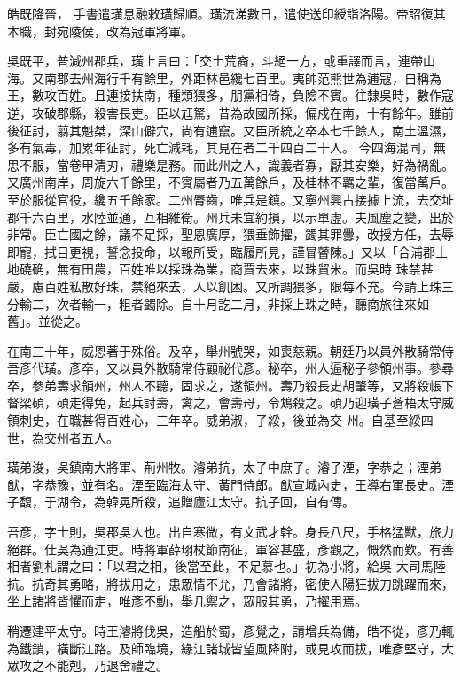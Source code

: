 \begin{pinyinscope}
 皓既降晉，
 手書遣璜息融敕璜歸順。璜流涕數日，遣使送印綬詣洛陽。帝詔復其本職，封宛陵侯，改為冠軍將軍。



 吳既平，普減州郡兵，璜上言曰：「交土荒裔，斗絕一方，或重譯而言，連帶山海。又南郡去州海行千有餘里，外距林邑纔七百里。夷帥范熊世為逋寇，自稱為王，數攻百姓。且連接扶南，種類猥多，朋黨相倚，負險不賓。往隸吳時，數作寇逆，攻破郡縣，殺害長吏。臣以尪駑，昔為故國所採，偏戍在南，十有餘年。雖前後征討，翦其魁桀，深山僻穴，尚有逋竄。又臣所統之卒本七千餘人，南土溫濕，多有氣毒，加累年征討，死亡減耗，其見在者二千四百二十人。
 今四海混同，無思不服，當卷甲清刃，禮樂是務。而此州之人，識義者寡，厭其安樂，好為禍亂。又廣州南岸，周旋六千餘里，不賓屬者乃五萬餘戶，及桂林不羈之輩，復當萬戶。至於服從官役，纔五千餘家。二州脣齒，唯兵是鎮。又寧州興古接據上流，去交址郡千六百里，水陸並通，互相維衛。州兵未宜約損，以示單虛。夫風塵之變，出於非常。臣亡國之餘，議不足採，聖恩廣厚，猥垂飾擢，蠲其罪釁，改授方任，去辱即寵，拭目更視，誓念投命，以報所受，臨履所見，謹冒瞽陳。」又以「合浦郡土地磽确，無有田農，百姓唯以採珠為業，商賈去來，以珠貿米。而吳時
 珠禁甚嚴，慮百姓私散好珠，禁絕來去，人以飢困。又所調猥多，限每不充。今請上珠三分輸二，次者輸一，粗者蠲除。自十月訖二月，非採上珠之時，聽商旅往來如舊」。並從之。



 在南三十年，威恩著于殊俗。及卒，舉州號哭，如喪慈親。朝廷乃以員外散騎常侍吾彥代璜。彥卒，又以員外散騎常侍顧祕代彥。秘卒，州人逼秘子參領州事。參尋卒，參弟壽求領州，州人不聽，固求之，遂領州。壽乃殺長史胡肇等，又將殺帳下督梁碩，碩走得免，起兵討壽，禽之，會壽母，令鴆殺之。碩乃迎璜子蒼梧太守威領刺史，在職甚得百姓心，三年卒。威弟淑，子綏，後並為交
 州。自基至綏四世，為交州者五人。



 璜弟浚，吳鎮南大將軍、荊州牧。濬弟抗，太子中庶子。濬子湮，字恭之；湮弟猷，字恭豫，並有名。湮至臨海太守、黃門侍郎。猷宣城內史，王導右軍長史。湮子馥，于湖令，為韓晃所殺，追贈廬江太守。抗子回，自有傳。



 吾彥，字士則，吳郡吳人也。出自寒微，有文武才幹。身長八尺，手格猛獸，旅力絕群。仕吳為通江吏。時將軍薛珝杖節南征，軍容甚盛，彥觀之，慨然而歎。有善相者劉札謂之曰：「以君之相，後當至此，不足慕也。」初為小將，給吳
 大司馬陸抗。抗奇其勇略，將拔用之，患眾情不允，乃會諸將，密使人陽狂拔刀跳躍而來，坐上諸將皆懼而走，唯彥不動，舉几禦之，眾服其勇，乃擢用焉。



 稍遷建平太守。時王濬將伐吳，造船於蜀，彥覺之，請增兵為備，皓不從，彥乃輒為鐵鎖，橫斷江路。及師臨境，緣江諸城皆望風降附，或見攻而拔，唯彥堅守，大眾攻之不能剋，乃退舍禮之。




\end{pinyinscope}
